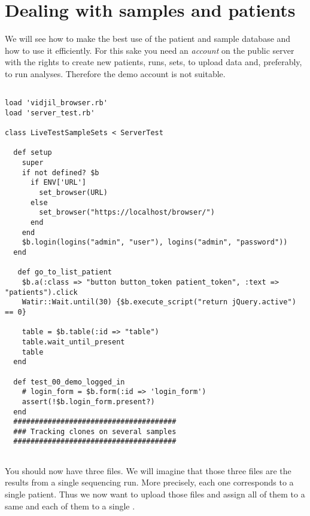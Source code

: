 \section{Dealing with samples and patients}
We will see how to make the best use of the patient and sample database and
how to use it efficiently.
For this sake you need an \textit{account} on the public server with the rights to create new patients,
runs, sets, to upload data and, preferably, to run analyses.
Therefore the demo account is not suitable.



\begin{verbatim}

load 'vidjil_browser.rb'
load 'server_test.rb'

class LiveTestSampleSets < ServerTest

  def setup
    super
    if not defined? $b
      if ENV['URL']
        set_browser(URL)
      else
        set_browser("https://localhost/browser/")
      end
    end
    $b.login(logins("admin", "user"), logins("admin", "password"))
  end

   def go_to_list_patient
    $b.a(:class => "button button_token patient_token", :text => "patients").click
    Watir::Wait.until(30) {$b.execute_script("return jQuery.active") == 0}

    table = $b.table(:id => "table")
    table.wait_until_present
    table
  end

  def test_00_demo_logged_in
    # login_form = $b.form(:id => 'login_form')
    assert(!$b.login_form.present?)
  end
  ######################################
  ### Tracking clones on several samples
  ######################################


\end{verbatim}
You should now have three files. We will imagine that those three files are
the results from a single sequencing run. More precisely, each one corresponds to
a single patient. Thus we now want to upload those files and assign all of
them to a same  and each of them to a single .

